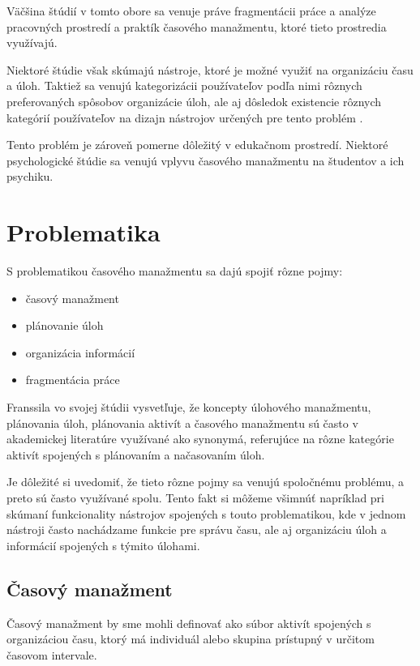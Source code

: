 \documentclass[10pt,slovak,a4paper]{article}
\begin{document}
	Väčšina štúdií v tomto obore \cite{Franssila,NoTask,Blandford} sa venuje práve fragmentácii práce a analýze pracovných prostredí a praktík časového manažmentu, ktoré tieto prostredia využívajú.
	
	Niektoré štúdie \cite{Franssila, Blandford, Haraty} však skúmajú nástroje, ktoré je možné využiť na organizáciu času a úloh. Taktiež sa venujú kategorizácii používateľov podľa nimi rôznych preferovaných spôsobov organizácie úloh, ale aj dôsledok existencie rôznych kategórií používateľov na dizajn nástrojov určených pre tento problém \cite{Haraty}.
	
	Tento problém je zároveň pomerne dôležitý v edukačnom prostredí. Niektoré psychologické štúdie \cite{Macan} sa venujú vplyvu časového manažmentu na študentov a ich psychiku.
	
\section{Problematika}

	S problematikou časového manažmentu sa dajú spojiť rôzne pojmy:
	\begin{itemize}
		\item časový manažment
		\item plánovanie úloh
		\item organizácia informácií
		\item fragmentácia práce
	\end{itemize}

	Franssila vo svojej štúdii\cite{Franssila} vysvetľuje, že koncepty úlohového manažmentu, plánovania úloh, plánovania aktivít a časového manažmentu sú často v akademickej literatúre využívané ako synonymá, referujúce na rôzne kategórie aktivít spojených s plánovaním a načasovaním úloh\cite{Franssila}.
	
	Je dôležité si uvedomiť, že tieto rôzne pojmy sa venujú spoločnému problému, a preto sú často využívané spolu. Tento fakt si môžeme všimnúť napríklad pri skúmaní funkcionality nástrojov spojených s touto problematikou, kde v jednom nástroji často nachádzame funkcie pre správu času, ale aj organizáciu úloh a informácií spojených s týmito úlohami.
	
	\subsection{Časový manažment} \label{casovy_manazment}
	
		Časový manažment by sme mohli definovať ako súbor aktivít spojených s organizáciou času, ktorý má individuál alebo skupina prístupný v určitom časovom intervale.
		
\end{document}
